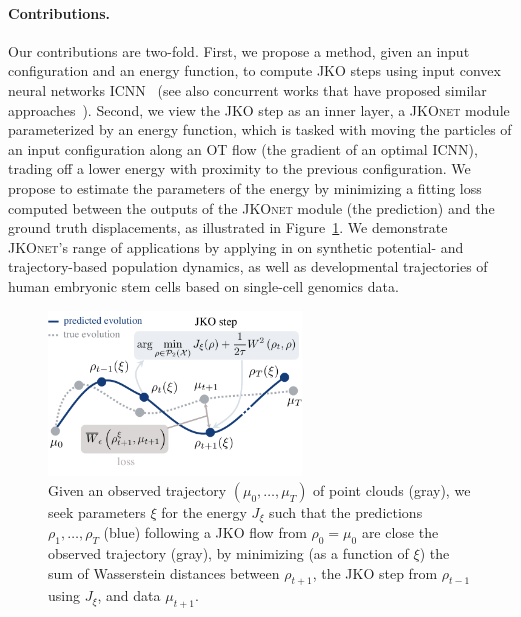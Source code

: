 
\paragraph{Contributions.}\hspace{1em} Our contributions are two-fold. First, we propose a method, given an input configuration and an energy function, to compute \acrshort{JKO} steps using input convex neural networks \acrlong{ICNN}~\citep{amos2017input,makkuva2020optimal} (see also concurrent works that have proposed similar approaches~\citep{alvarez2021optimizing, mokrov2021large}). Second, we view the \acrshort{JKO} step as an inner layer, a \textsc{JKOnet} module parameterized by an energy function, which is tasked with moving the particles of an input configuration along an OT flow (the gradient of an optimal ICNN), trading off a lower energy with proximity to the previous configuration.
We propose to estimate the parameters of the energy by minimizing a fitting loss %
computed between the outputs of the \textsc{JKOnet} module (the prediction) and the ground truth displacements, as illustrated in Figure~\ref{fig:overview_jkonet}.
We demonstrate \textsc{JKOnet}'s range of applications by applying in on synthetic potential- and trajectory-based population dynamics, as well as developmental trajectories of human embryonic stem cells based on single-cell genomics data.

\begin{figure}[t]
    \centering
    \includegraphics[width=0.6\textwidth]{figures/fig_overview_jkonet.pdf}
    \caption{Given an observed trajectory $(\mu_0,\dots,\mu_T)$ of point clouds (gray), we seek parameters $\xi$ for the energy $J_\xi$ such that the predictions $\rho_1, \dots, \rho_T$ (blue) following a \acrshort{JKO} flow from $\rho_0=\mu_0$ are close the observed trajectory (gray), by minimizing (as a function of $\xi$) the sum of Wasserstein distances between $\rho_{t+1}$, the \acrshort{JKO} step from $\rho_{t-1}$ using $J_\xi$, and data $\mu_{t+1}$.}
    \label{fig:overview_jkonet}
\end{figure}

